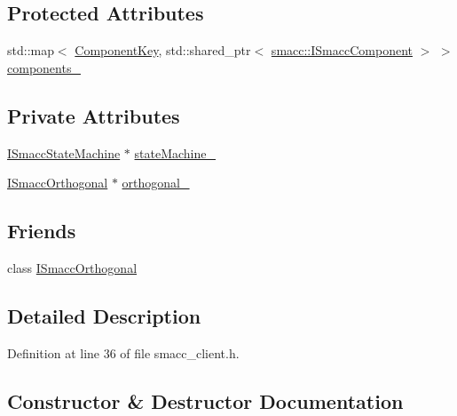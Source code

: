 \subsection*{Protected Attributes}
\begin{DoxyCompactItemize}
\item 
std\+::map$<$ \hyperlink{structsmacc_1_1ComponentKey}{Component\+Key}, std\+::shared\+\_\+ptr$<$ \hyperlink{classsmacc_1_1ISmaccComponent}{smacc\+::\+I\+Smacc\+Component} $>$ $>$ \hyperlink{classsmacc_1_1ISmaccClient_a9e670e9071bb549dbeb08985d0114afe}{components\+\_\+}
\end{DoxyCompactItemize}
\subsection*{Private Attributes}
\begin{DoxyCompactItemize}
\item 
\hyperlink{classsmacc_1_1ISmaccStateMachine}{I\+Smacc\+State\+Machine} $\ast$ \hyperlink{classsmacc_1_1ISmaccClient_a926e4f2ae796def63d48dca389a48c47}{state\+Machine\+\_\+}
\item 
\hyperlink{classsmacc_1_1ISmaccOrthogonal}{I\+Smacc\+Orthogonal} $\ast$ \hyperlink{classsmacc_1_1ISmaccClient_a571c7f672d9c90128b5498aefc27c136}{orthogonal\+\_\+}
\end{DoxyCompactItemize}
\subsection*{Friends}
\begin{DoxyCompactItemize}
\item 
class \hyperlink{classsmacc_1_1ISmaccClient_a7205cc84a71fea903124d54d01e99a68}{I\+Smacc\+Orthogonal}
\end{DoxyCompactItemize}


\subsection{Detailed Description}


Definition at line 36 of file smacc\+\_\+client.\+h.



\subsection{Constructor \& Destructor Documentation}
\mbox{\label{classsmacc_1_1ISmaccClient_a40222ad8b9b7962755434025b1fd5ae7}} 
